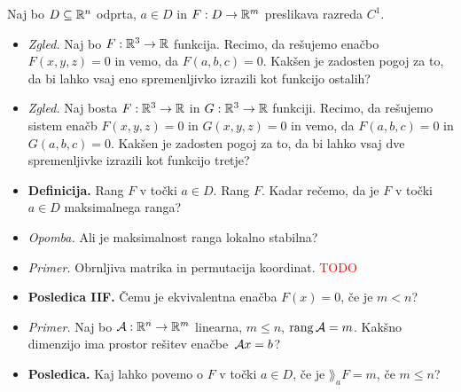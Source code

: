 \begin{enumerate}
    Naj bo $D \subseteq \mathbb{R}^n$ odprta, $a \in D$ in $F: D \to \mathbb{R}^m$ preslikava razreda $C^1$.
    \begin{itemize}
        \item \colorbox{yellow!30}{\emph{Zgled.}} Naj bo $F: \mathbb{R}^3 \to \mathbb{R}$ funkcija. Recimo, da rešujemo enačbo $F(x,y,z) = 0$ in vemo, da $F(a,b,c) = 0$. Kakšen je zadosten pogoj za to, da bi lahko vsaj eno spremenljivko izrazili kot funkcijo ostalih?
        \item \colorbox{yellow!30}{\emph{Zgled.}} Naj bosta $F: \mathbb{R}^3 \to \mathbb{R}$ in $G: \mathbb{R}^3 \to \mathbb{R}$ funkciji. Recimo, da rešujemo sistem enačb $F(x,y,z) = 0$ in $G(x,y,z) = 0$ in vemo, da  $F(a,b,c) = 0$ in  $G(a,b,c) = 0$. Kakšen je zadosten pogoj za to, da bi lahko vsaj dve spremenljivke izrazili kot funkcijo tretje?
        \item \colorbox{purple!30}{\textbf{Definicija.}} Rang $F$ v točki $a \in D$. Rang $F$. Kadar rečemo, da je $F$ v točki $a \in D$ maksimalnega ranga?
        \item \colorbox{yellow!30}{\emph{Opomba.}} Ali je maksimalnost ranga lokalno stabilna?
        \item \colorbox{yellow!30}{\emph{Primer.}} Obrnljiva matrika in permutacija koordinat. \textcolor{red}{TODO}
        \item \colorbox{orange!30}{\textbf{Posledica IIF.}} Čemu je ekvivalentna enačba $F(x) = 0$, če je $m < n$?
        \item \colorbox{yellow!30}{\emph{Primer.}} Naj bo $\mathcal{A}: \mathbb{R}^n \to \mathbb{R}^m$ linearna, $m \leq n$, $\operatorname{rang} \mathcal{A} = m$. Kakšno dimenzijo ima prostor rešitev enačbe~$\mathcal{A}x=b$?
        \item \colorbox{orange!30}{\textbf{Posledica.}} Kaj lahko povemo o $F$ v točki $a \in D$, če je $\rang_a F = m$, če $m \leq n$?
    \end{itemize}
\end{enumerate}

\newpage

